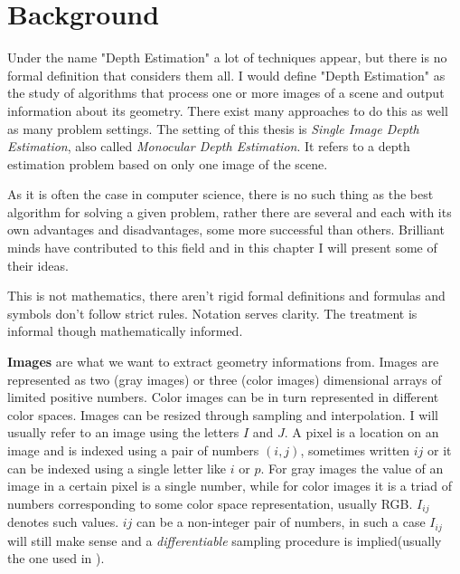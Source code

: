 \section{Background}
Under the name "Depth Estimation" a lot of techniques appear, but there is no formal definition that considers them all.
I would define "Depth Estimation" as the study of algorithms that process one or more images of a scene and output information about its geometry.
There exist many approaches to do this as well as many problem settings.
The setting of this thesis is \textit{Single Image Depth Estimation}, also called \textit{Monocular Depth Estimation}.
It refers to a depth estimation problem based on only one image of the scene.

As it is often the case in computer science, there is no such thing as the best algorithm for solving a given problem, rather there are several and each with its own advantages and disadvantages, some more successful than others.
Brilliant minds have contributed to this field and in this chapter I will present some of their ideas.


This is not mathematics, there aren't rigid formal definitions and formulas and symbols don't follow strict rules.
Notation serves clarity.
The treatment is informal though mathematically informed.


\textbf{Images} are what we want to extract geometry informations from.
Images are represented as two (gray images) or three (color images) dimensional arrays of limited positive numbers.
Color images can be in turn represented in different color spaces.
Images can be resized through sampling and interpolation.
I will usually refer to an image using the letters $I$ and $J$.
A pixel is a location on an image and is indexed using a pair of numbers $(i, j)$, sometimes written $ij$ or it can be indexed using a single letter like $i$ or $p$.
For gray images the value of an image in a certain pixel is a single number, while for color images it is a triad of numbers corresponding to some color space representation, usually RGB.
$I_{ij}$ denotes such values.
$ij$ can be a non-integer pair of numbers, in such a case $I_{ij}$ will still make sense and a \textit{differentiable} sampling procedure is implied(usually the one used in \cite{STN}).



